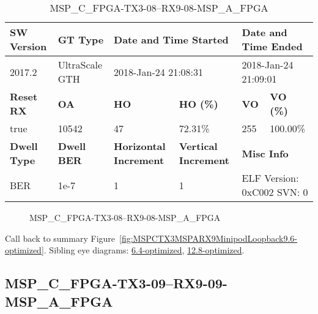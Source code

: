 \begin{table}[h]
\centering
\caption{MSP\_C\_FPGA-TX3-08--RX9-08-MSP\_A\_FPGA}
\label{tab:MSPCFPGATX308RX908MSPAFPGA9.6-optimized}
\begin{tabular}{@{}|l|l|l|l|l|l|@{}}
\toprule
\textbf{SW Version}                & \textbf{GT Type}   & \multicolumn{2}{l|}{\textbf{Date and Time Started}}            & \multicolumn{2}{l|}{\textbf{Date and Time Ended}}        \\ \midrule
2017.2                       & UltraScale GTH          & \multicolumn{2}{l|}{2018-Jan-24 21:08:31}                   & \multicolumn{2}{l|}{2018-Jan-24 21:09:01}               \\ \midrule
\textbf{Reset RX}                  & \textbf{OA} & \textbf{HO}   & \textbf{HO (\%)} & \textbf{VO} & \textbf{VO (\%)} \\ \midrule
true & 10542        & 47          & 72.31\%        & 255        & 100.00\%       \\ \midrule
\textbf{Dwell Type}                & \textbf{Dwell BER} & \textbf{Horizontal Increment} & \textbf{Vertical Increment}    & \multicolumn{2}{l|}{\textbf{Misc Info}}                  \\ \midrule
BER                            & 1e-7        & 1        & 1           & \multicolumn{2}{l|}{ELF Version: 0xC002 SVN: 0}                         \\ \bottomrule
\end{tabular}
\end{table}

\begin{figure}[h]
\caption{MSP\_C\_FPGA-TX3-08--RX9-08-MSP\_A\_FPGA} \label{fig:MSPCFPGATX308RX908MSPAFPGA9.6-optimized}
\end{figure}

Call back to summary Figure~\ref{fig:MSPCTX3MSPARX9MinipodLoopback9.6-optimized}.
Sibling eye diagrams: \hyperref[sec:MSPCFPGATX308RX908MSPAFPGA6.4-optimized]{6.4-optimized}, \hyperref[sec:MSPCFPGATX308RX908MSPAFPGA12.8-optimized]{12.8-optimized}.

\clearpage
\newpage


\subsection{MSP\_C\_FPGA-TX3-09--RX9-09-MSP\_A\_FPGA}\label{sec:MSPCFPGATX309RX909MSPAFPGA9.6-optimized}

